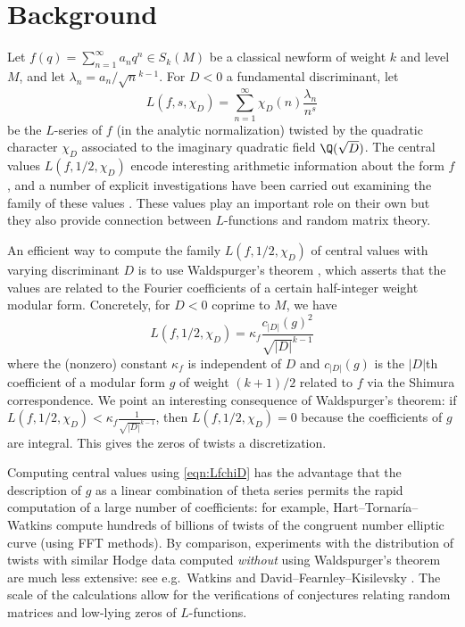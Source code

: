 \documentclass[11pt]{amsart}
\newcommand     {\abs}[1]       {{\left\lvert{#1}\right\rvert}}
\begin{document}
\section{Background}

Let $f(q)=\sum_{n=1}^{\infty} a_n q^n \in S_k(M)$ be a classical newform of weight $k$ and level $M$, and let $\lambda_n=a_n/\sqrt{n}^{k-1}$.  For $D<0$ a fundamental discriminant, let 
\[ 
L(f,s,\chi_D)=\sum_{n=1}^{\infty}  \chi_D(n)\frac{\lambda_n}{n^s} 
\]
be the $L$-series of $f$ (in the analytic normalization) twisted by the quadratic character $\chi_D$ associated to the imaginary quadratic field $\Q(\sqrt{D})$.  The central values $L(f,1/2,\chi_D)$ encode interesting arithmetic information about the form $f$, and a number of explicit investigations have been carried out examining the family of these values \cite{Gross,BSP,PT2,PT1,MRVT}.  These values play an important role on their own but they also provide connection between $L$-functions and random matrix theory. 

An efficient way to compute the family $L(f,1/2,\chi_D)$ of central values with varying discriminant $D$ is to use Waldspurger's theorem \cite{Waldspurger}, which asserts that the values are related to the Fourier coefficients of a certain half-integer weight modular form.  Concretely, for $D<0$ coprime to $M$, we have
\begin{equation} \label{eqn:LfchiD}
L(f,1/2,\chi_D) = \kappa_f  \frac{c_{|D|}(g)^2}{\sqrt{\abs{D}}^{k-1}}
\end{equation}
where the (nonzero) constant $\kappa_f$ is independent of $D$ and $c_{|D|}(g)$ is the $|D|$th coefficient of a modular form $g$ of weight $(k+1)/2$ related to $f$ via the Shimura correspondence.  We point an interesting consequence of Waldspurger's theorem:  if $L(f, 1/2, \chi_D) < \kappa_f  \frac{1}{\sqrt{\abs{D}}^{k-1}}$, then $L(f, 1/2, \chi_D)=0$ because the coefficients of $g$ are integral.  This gives the zeros of twists a discretization.

Computing central values using \eqref{eqn:LfchiD} has the advantage that the description of $g$ as a linear combination of theta series permits the rapid computation of a large number of coefficients: for example, Hart--Tornar\'ia--Watkins \cite{hart2010congruent} compute hundreds of billions of twists of the congruent number elliptic curve (using FFT methods).  By comparison, experiments with the distribution of twists with similar Hodge data computed \emph{without} using Waldspurger's theorem are much less extensive: see e.g.\ Watkins \cite[\S 6.6]{MR2410120} and David--Fearnley--Kisilevsky \cite{MR2322350}.  The scale of the calculations allow for the verifications of conjectures relating random matrices and low-lying zeros of $L$-functions.
\end{document}

